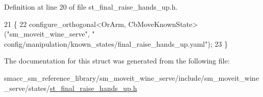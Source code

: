 Definition at line 20 of file st\+\_\+final\+\_\+raise\+\_\+hands\+\_\+up.\+h.


\begin{DoxyCode}
21     \{
22         configure\_orthogonal<OrArm, CbMoveKnownState>(\textcolor{stringliteral}{"sm\_moveit\_wine\_serve"}, \textcolor{stringliteral}{"
      config/manipulation/known\_states/final\_raise\_hands\_up.yaml"});
23     \}
\end{DoxyCode}


The documentation for this struct was generated from the following file\+:\begin{DoxyCompactItemize}
\item 
smacc\+\_\+sm\+\_\+reference\+\_\+library/sm\+\_\+moveit\+\_\+wine\+\_\+serve/include/sm\+\_\+moveit\+\_\+wine\+\_\+serve/states/\hyperlink{sm__moveit__wine__serve_2include_2sm__moveit__wine__serve_2states_2st__final__raise__hands__up_8h}{st\+\_\+final\+\_\+raise\+\_\+hands\+\_\+up.\+h}\end{DoxyCompactItemize}
